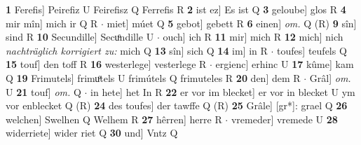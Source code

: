 \documentclass[8pt,a4paper,notitlepage]{article}
\begin{document}
\begin{table}[ht]
\begin{minipage}[t]{0.5\linewidth}
\textbf{1} Ferefis] Peirefiz U Feirefisz Q Ferrefis R \textbf{2} ist ez] Es ist Q \textbf{3} geloube] glos R \textbf{4} mir mîn] mich ir Q R  $\cdot$ miet] múet Q \textbf{5} gebot] gebett R \textbf{6} einen] \textit{om.} Q (R) \textbf{9} sîn] sind R \textbf{10} Secundille] Secuͦndille U  $\cdot$ ouch] ich R \textbf{11} mir] mich R \textbf{12} mich] nich \textit{nachträglich korrigiert zu:} mich Q \textbf{13} sîn] sich Q \textbf{14} im] in R  $\cdot$ toufes] teufels Q \textbf{15} touf] den toff R \textbf{16} westerlege] vesterlege R  $\cdot$ ergienc] erhinc U \textbf{17} kûme] kam Q \textbf{19} Frimutels] frimuͦtels U frimútels Q frimuteles R \textbf{20} den] dem R  $\cdot$ Grâl] \textit{om.} U \textbf{21} touf] \textit{om.} Q  $\cdot$ in hete] het In R \textbf{22} er vor im blecket] er vor in blecket U ym vor enblecket Q (R) \textbf{24} des toufes] der tawffe Q (R) \textbf{25} Grâle] [gr*]: grael Q \textbf{26} welchen] Swelhen Q Welhem R \textbf{27} hêrren] herre R  $\cdot$ vremeder] vremede U \textbf{28} widerriete] wider riet Q \textbf{30} und] Vntz Q \newline
\end{minipage}
\end{table}
\end{document}
